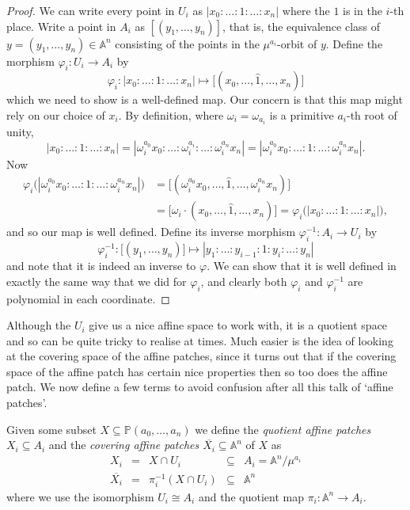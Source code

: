 \documentclass[10pt,notitlepage]{article}
\numberwithin{equation}{subsection}
\newcommand{\aff}{\mathbb{A}}
\newcommand{\pee}{\mathbb{P}}
\newcommand{\remove}[1]{\widehat{#1}}
\newcommand{\cover}[1]{\overline{#1}}
\begin{document}
    \begin{proof}
        We can write every point in $U_i$ as $|x_0:\ldots:1:\ldots:x_n|$ where the $1$ is in the $i$-th place.
        Write a point in $A_i$ as $[(y_1,\ldots,y_n)]$, that is, the equivalence class of $y=(y_1,\ldots,y_n)\in\aff^n$ consisting of the points in the $\mu^{a_i}$-orbit of $y$.
        Define the morphism $\varphi_i\colon U_i\to A_i$ by
        \[
            \varphi_i\colon |x_0:\ldots:1:\ldots:x_n| \mapsto \big[(x_0,\ldots,\remove{1},\ldots,x_n)\big]
        \]
        which we need to show is a well-defined map.
        Our concern is that this map might rely on our choice of $x_i$.
        By definition, where $\omega_i=\omega_{a_i}$ is a primitive $a_i$-th root of unity,
        \[
            |x_0:\ldots:1:\ldots:x_n| = |\omega_i^{a_0}x_0:\ldots:\omega_i^{a_i}:\ldots:\omega_i^{a_n}x_n| = |\omega_i^{a_0}x_0:\ldots:1:\ldots:\omega_i^{a_n}x_n|.
        \]
        Now
        \begin{align*}
                \varphi_i\big(|\omega_i^{a_0}x_0:\ldots:1:\ldots:\omega_i^{a_n}x_n|\big) &= \big[(\omega_i^{a_0}x_0,\ldots,\remove{1},\ldots,\omega_i^{a_n}x_n)\big] \\
                &= \big[\omega_i\cdot(x_0,\ldots,\remove{1},\ldots,x_n)\big] = \varphi_i\big(|x_0:\ldots:1:\ldots:x_n|\big),
        \end{align*}
        and so our map is well defined.
        Define its inverse morphism $\varphi_i^{-1}\colon A_i\to U_i$ by
        \[
            \varphi_i^{-1}\colon \big[(y_1,\ldots,y_n)\big] \mapsto |y_1:\ldots:y_{i-1}:1:y_i:\ldots:y_n|
        \]
        and note that it is indeed an inverse to $\varphi$.
        We can show that it is well defined in exactly the same way that we did for $\varphi_i$, and clearly both $\varphi_i$ and $\varphi_i^{-1}$ are polynomial in each coordinate.
    \end{proof}

    Although the $U_i$ give us a nice affine space to work with, it is a quotient space and so can be quite tricky to realise at times.
    Much easier is the idea of looking at the covering space of the affine patches, since it turns out that if the covering space of the affine patch has certain nice properties then so too does the affine patch.
    We now define a few terms to avoid confusion after all this talk of `affine patches'.

    \begin{definition}\label{defn:quotient-covering-affine-patches}
        Given some subset $X\subseteq\pee(a_0,\ldots,a_n)$ we define the \emph{quotient affine patches $X_i\subseteq A_i$} and the \emph{covering affine patches $\cover{X_i}\subseteq\aff^n$} of $X$ as
        \[
            \begin{array}{rllll}
                X_i &=& X\cap U_i &\subseteq& A_i=\aff^n/\mu^{a_i} \\[0.45em]
                \cover{X_i} &=& \pi_i^{-1}(X\cap U_i) &\subseteq& \aff^n
            \end{array}
        \]
        where we use the isomorphism \mbox{$U_i\cong A_i$} and the quotient map $\pi_i\colon \aff^n\to A_i$.
    \end{definition}
\end{document}
